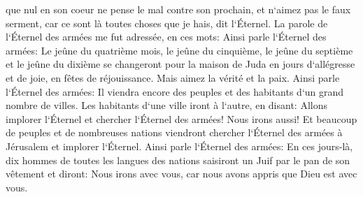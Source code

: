 \verse que nul en son coeur ne pense le mal contre son prochain, et n`aimez pas le faux serment, car ce sont là toutes choses que je hais, dit l`Éternel. 
\verse La parole de l`Éternel des armées me fut adressée, en ces mots: 
\verse Ainsi parle l`Éternel des armées: Le jeûne du quatrième mois, le jeûne du cinquième, le jeûne du septième et le jeûne du dixième se changeront pour la maison de Juda en jours d`allégresse et de joie, en fêtes de réjouissance. Mais aimez la vérité et la paix. 
\verse Ainsi parle l`Éternel des armées: Il viendra encore des peuples et des habitants d`un grand nombre de villes. 
\verse Les habitants d`une ville iront à l`autre, en disant: Allons implorer l`Éternel et chercher l`Éternel des armées! Nous irons aussi! 
\verse Et beaucoup de peuples et de nombreuses nations viendront chercher l`Éternel des armées à Jérusalem et implorer l`Éternel. 
\verse Ainsi parle l`Éternel des armées: En ces jours-là, dix hommes de toutes les langues des nations saisiront un Juif par le pan de son vêtement et diront: Nous irons avec vous, car nous avons appris que Dieu est avec vous. 

\chapter{}

